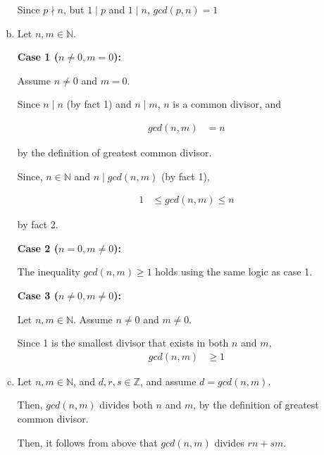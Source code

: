 \documentclass[12pt]{article}
\begin{document}
\begin{enumerate}[a.]
    Since $p \nmid n$, but $1 \mid p$ and $1 \mid n$, $gcd(p,n) = 1$

    \item

    Let $n,m \in \mathbb{N}$.

    \bigskip

    \textbf{Case 1 ($n \neq 0, m = 0$):}

    \bigskip

    Assume $n \neq 0$ and $m = 0$.

    \bigskip

    Since $n \mid n$ (by fact 1) and $n \mid m$, $n$ is a common divisor, and

    \bigskip
    \setcounter{equation}{0}
    \begin{align}
        gcd(n,m) &= n
    \end{align}

    by the definition of greatest common divisor.

    \bigskip

    Since, $n \in \mathbb{N}$ and $n \mid gcd(n,m)$ (by fact 1),

    \begin{align}
        1 &\leq gcd(n,m) \leq n
    \end{align}

    by fact 2.

    \bigskip

    \textbf{Case 2 ($n = 0, m \neq 0$):}

    \bigskip

    The inequality $gcd(n,m) \geq 1$ holds using the same logic as case 1.

    \bigskip

    \textbf{Case 3 ($n \neq 0, m \neq 0$):}

    \bigskip

    Let $n,m \in \mathbb{N}$. Assume $n \neq 0$ and $m \neq 0$.

    \bigskip

    Since 1 is the smallest divisor that exists in both $n$ and $m$,
    \setcounter{equation}{0}
    \begin{align}
        gcd(n,m) &\geq 1
    \end{align}

    \item

    Let $n,m \in \mathbb{N}$, and $d,r,s \in \mathbb{Z}$, and assume $d = gcd(n,m)$.

    \bigskip

    Then, $gcd(n,m)$ divides both $n$ and $m$, by the definition of greatest
    common divisor.

    \bigskip

    Then, it follows from above that $gcd(n,m)$ divides $rn + sm$.


\end{enumerate}
\end{document}
